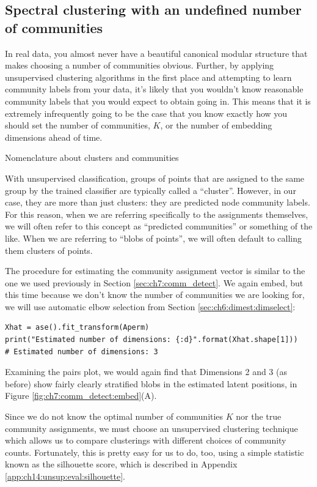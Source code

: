 \subsection{Spectral clustering with an undefined number of communities}
\label{sec:ch7:comm_detect:unknown}

In real data, you almost never have a beautiful canonical modular structure that makes choosing a number of communities obvious. Further, by applying unsupervised clustering algorithms in the first place and attempting to learn community labels from your data, it's likely that you wouldn't know reasonable community labels that you would expect to obtain going in. This means that it is extremely infrequently going to be the case that you know exactly how you should set the number of communities, $K$, or the number of embedding dimensions ahead of time.

\begin{floatingbox}[h]\caption{Nomenclature about clusters and communities}
With unsupervised classification, groups of points that are assigned to the same group by the trained classifier are typically called a ``cluster''. However, in our case, they are more than just clusters: they are predicted node community labels. For this reason, when we are referring specifically to the assignments themselves, we will often refer to this concept as ``predicted communities'' or something of the like. When we are referring to ``blobs of points'', we will often default to calling them clusters of points. 
\end{floatingbox}

The procedure for estimating the community assignment vector is similar to the one we used previously in Section \ref{sec:ch7:comm_detect}. We again embed, but this time because we don't know the number of communities we are looking for, we will use automatic elbow selection from Section \ref{sec:ch6:dimest:dimselect}:

\begin{lstlisting}[style=python]
Xhat = ase().fit_transform(Aperm)
print("Estimated number of dimensions: {:d}".format(Xhat.shape[1]))
# Estimated number of dimensions: 3
\end{lstlisting}
Examining the pairs plot, we would again find that Dimensions 2 and 3 (as before) show fairly clearly stratified blobs in the estimated latent positions, in Figure \ref{fig:ch7:comm_detect:embed}(A). 

Since we do not know the optimal number of communities $K$ nor the true community assignments, we must choose an unsupervised clustering technique which allows us to compare clusterings with different choices of community counts. Fortunately, this is pretty easy for us to do, too, using a simple statistic known as the silhouette score, which is described in Appendix \ref{app:ch14:unsup:eval:silhouette}.

